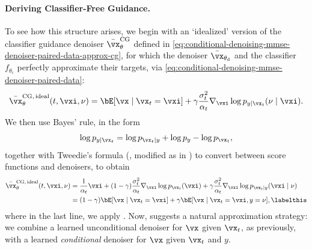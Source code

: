 \documentclass[../../book-main.tex]{subfiles}
\begin{document}
\paragraph{Deriving Classifier-Free Guidance.} To see how this
structure arises, we
begin with an `idealized' version of the classifier guidance denoiser
$\bar{\vx}_{\theta}^{\mathrm{CG}}$ defined in
\eqref{eq:conditional-denoising-mmse-denoiser-paired-data-approx-cg},
for which the denoiser $\bar{\vx}_{\theta_{\mathrm{d}}}$ and the classifier
$f_{\theta_{\mathrm{c}}}$ perfectly approximate their targets, via
\eqref{eq:conditional-denoising-mmse-denoiser-paired-data}:
\begin{equation}\label{eq:conditional-denoising-mmse-denoiser-paired-data-exact-cg}
    \bar{\vx}_{\theta}^{\mathrm{CG,\,ideal}}(t, \vxi, \nu)
    =
    \bE[\vx \mid \vx_t=\vxi]
    + \gamma\frac{\sigma_t^2}{\alpha_t}
    \nabla_{\vxi}\log p_{y \mid \vx_t}(\nu\mid \vxi).
\end{equation}
We then use Bayes' rule, in the form
\begin{equation}
    \log p_{y \mid \vx_t}
    =
    \log p_{\vx_t \mid y} + \log p_{y} - \log p_{\vx_t},
\end{equation}
together with Tweedie's formula (, modified as in
) to convert between score functions and denoisers,
to obtain
\begin{align*}
    \bar{\vx}_{\theta}^{\mathrm{CG,\,ideal}}(t, \vxi, \nu)
    &=
    \frac{1}{\alpha_t} \vxi
    + (1-\gamma) \frac{\sigma_t^2}{\alpha_t}
    \nabla_{\vxi}\log p_{\vx_t}(\vxi)
    + \gamma \frac{\sigma_t^2}{\alpha_t}
    \nabla_{\vxi}\log p_{\vx_t \mid y}(\vxi \mid \nu)
    \\
    &=
    (1 - \gamma) \bE[\vx \mid \vx_t=\vxi]
    +
    \gamma \bE[\vx \mid \vx_t=\vxi, y=\nu],
    \labelthis\label{eq:ideal-cfg-denoiser}
\end{align*}
where in the last line, we apply
.
Now,  suggests a natural approximation strategy: we
combine a learned unconditional denoiser for $\vx$ given $\vx_t$, as previously,
with a learned \textit{conditional} denoiser for $\vx$ given $\vx_t$ and $y$.
\end{document}
